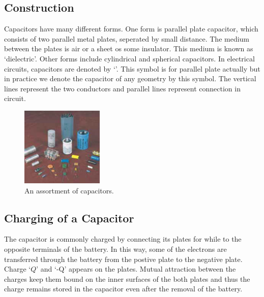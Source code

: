 \subsection*{Construction}
Capacitors have many different forms. One form is parallel plate capacitor,
which consists of two parallel metal plates, seperated by small distance.
The medium between the plates is air or a sheet os some insulator.
This medium is known as `dielectric’. Other forms include cylindrical
and spherical capacitors. In electrical circuits,
capacitors are denoted by `\capacitor{}’. This symbol is for parallel plate
actually but in practice we denote the capacitor of any geometry by
this symbol. The vertical lines represent the
two conductors and parallel lines represent connection in circuit.

\begin{figure}[H]
  \centering
  \includegraphics[width=0.35\textwidth]{Images/Chapter-11/11.29.png}
  \caption{An assortment of capacitors.}
  \label{fig:11.29}
\end{figure}
\subsection*{Charging of a Capacitor}
The capacitor is commonly charged by connecting its plates for while to
the opposite terminals of the battery. In this way, some of the electrons
are transferred through the battery from the postive plate to the negative
plate. Charge `$Q$' and `-Q’ appears on the plates. Mutual attraction between
the charges keep them bound on the inner surfaces of the both plates and
thus the charge remains stored in the capacitor even after the removal of
the battery.

